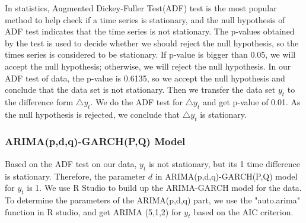 In statistics, Augmented  Dickey-Fuller Test(ADF) test is the most popular method to help check if a time series is stationary, and the null hypothesis of ADF test indicates that the time series is not stationary.  The p-values obtained by the test is used to decide whether we should reject the null hypothesis, so the times series is considered to be stationary. If p-value is bigger than 0.05, we will accept the null hypothesis; otherwise, we will reject the null hypothesis. In our ADF test of data, the p-value is 0.6135,  so we accept the null hypothesis and conclude that the data set is not stationary. Then we transfer the data set $y_t$ to the difference 
form $\triangle$$y_t$.  We do the ADF test for $\triangle$$y_t$  and get p-value of 0.01. As the null hypothesis is rejected, we conclude that $\triangle$$y_t$ is stationary. %

\subsubsection{ARIMA(p,d,q)-GARCH(P,Q) Model}
Based on the ADF test on our data, $y_t$ is not stationary, but its 1 time difference is stationary. Therefore, the parameter $d$ in  ARIMA(p,d,q)-GARCH(P,Q) model for $y_t$ is 1. We use R Studio to build up the ARIMA-GARCH model for the data. To determine the parameters of the ARIMA(p,d,q) part, we use the "auto.arima" function in R studio,  and get ARIMA (5,1,2) for $y_t$ based on the AIC criterion. %




